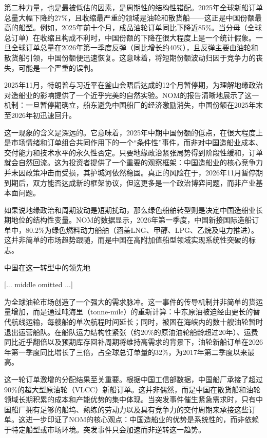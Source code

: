 \documentclass[11pt]{ctexart}
\begin{document}
第二种力量，也是最被低估的因素，是周期性的结构性错配。2025年全球新船订单总量大幅下降约27\%，且收缩最严重的领域是油轮和散货船——这正是中国份额最高的船型。例如，2025年前十个月，成品油轮订单同比下降近85\%。当分母（全球总订单）在收缩且构成不利时，中国份额的下降在很大程度上是一个统计假象。一旦全球订单总量在2026年第一季度反弹（同比增长约40\%），且反弹主要由油轮和散货船引领，中国份额便迅速恢复。这意味着，将短期份额波动归因于竞争力的丧失，可能是一个严重的误判。

2025年11月，特朗普与习近平在釜山会晤后达成的12个月暂停期，为理解地缘政治对造船业的影响提供了一个近乎完美的自然实验。NOM的报告清晰地展示了这一机制：一旦暂停期确立，船东避免中国船厂的经济激励消失，中国份额在2025年末至2026年初迅速回升。

这一现象的含义是深远的。它意味着，2025年中期中国份额的低点，在很大程度上是市场情绪和订单组合共同作用下的一个“条件性”事件，而非对中国造船业成本、交付能力和技术水平的永久性否定。只要地缘政治紧张局势得到阶段性缓和，订单就会自然回流。这为投资者提供了一个重要的观察框架：中国造船业的核心竞争力并未因政策冲击而受损，其护城河依然稳固。真正的风险在于，2026年11月暂停期到期后，双方能否达成新的框架协议，但这更多是一个政治博弈问题，而非产业基本面问题。

如果说地缘政治和周期波动是短期扰动，那么绿色船舶转型则是决定中国造船业长期地位的结构性变量。NOM的数据显示，2026年第一季度，中国新接国际造船订单中，80.2\%为绿色燃料动力船舶（涵盖LNG、甲醇、LPG、乙烷及电力推进）。这并非简单的市场趋势跟随，而是中国在高附加值船型领域实现系统性突破的标志。

中国在这一转型中的领先地

[... middle omitted ...]

为全球油轮市场创造了一个强大的需求脉冲。这一事件的传导机制并非简单的货运量增加，而是通过吨海里（tonne-mile）的重新计算：中东原油被迫经由更长的替代航线运输，每艘船的单次航程时间延长；同时，被困在海峡内的数十艘油轮暂时退出运营船队。在船队运力结构性紧张（约20\%的原油油轮船龄超过20年）、运费同比近乎翻倍以及预期库存回补周期将维持高需求的背景下，油轮新船订单在2026年第一季度同比增长了三倍，占全球总订单量的32\%，为2017年第二季度以来最高。

这一轮订单激增的分配结果至关重要。根据中国工信部数据，中国船厂承接了超过90\%的超大型原油轮（VLCC）新船订单。这并非偶然，而是中国在散货船和油轮领域长期积累的成本和产能优势的集中体现。当突发事件催生紧急需求时，只有中国船厂拥有足够的船坞、熟练的劳动力以及具有竞争力的交付周期来承接这些订单。这进一步印证了NOM的核心观点：中国造船业的优势是系统性的，而非依赖于特定船型或市场环境。突发事件只会加速而非逆转这一趋势。
\end{document}
